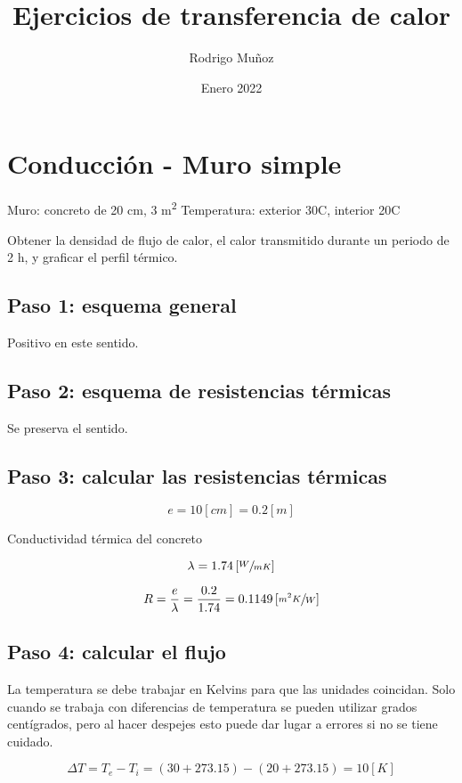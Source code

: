 \documentclass[12pt]{article}
\title{Ejercicios de transferencia de calor}
\author{Rodrigo Muñoz}
\date{Enero 2022}
\begin{document}
\maketitle

\section{Conducción - Muro simple}

Muro: concreto de 20 cm, 3 m\textsuperscript{2}
Temperatura: exterior 30\degree C, interior 20\degree C

Obtener la densidad de flujo de calor, el calor transmitido durante un periodo de 2 h, y graficar el perfil térmico.

\subsection{Paso 1: esquema general}

Positivo en este sentido.

\subsection{Paso 2: esquema de resistencias térmicas}

Se preserva el sentido.

\subsection{Paso 3: calcular las resistencias térmicas}

\[ e = 10 \left[ cm \right] = 0.2 \left[ m \right] \]

Conductividad térmica del concreto

\[ \lambda = 1.74 \left[ \sfrac{ W }{ m K } \right] \]

\[ R = \frac{ e }{ \lambda } = \frac{ 0.2 }{ 1.74 } = 0.1149 \left[ \sfrac{ m ^ 2 K }{ W } \right] \]

\subsection{Paso 4: calcular el flujo}

La temperatura se debe trabajar en Kelvins para que las unidades coincidan. Solo cuando se trabaja con diferencias de temperatura se pueden utilizar grados centígrados, pero al hacer despejes esto puede dar lugar a errores si no se tiene cuidado.

\[ \Delta T = T_e - T_i = \left( 30 + 273.15 \right) - \left( 20 + 273.15 \right) = 10 \left[ K \right] \]
\end{document}
